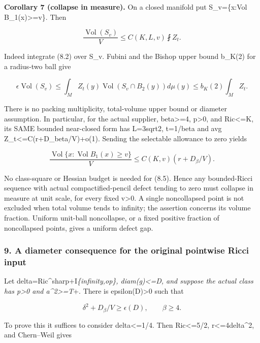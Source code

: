 \documentclass[
  10pt,
]{article}
\begin{document}
\textbf{Corollary 7 (collapse in measure).} On a closed manifold put
S\_v=\{x:Vol B\_1(x)\textgreater=v\}. Then

\[
 \boxed{\frac{\operatorname{Vol}(S_v)}V
       \le C(K,L,v)\fint Z_t.}                        \tag{8.4}
\]

Indeed integrate (8.2) over S\_v. Fubini and the Bishop upper bound
b\_K(2) for a radius-two ball give

\[
 \epsilon\operatorname{Vol}(S_v)
 \le\int_M Z_t(y)\operatorname{Vol}(S_v\cap B_2(y))d\mu(y)
 \le b_K(2)\int_M Z_t.
\]

There is no packing multiplicity, total-volume upper bound or diameter
assumption. In particular, for the actual supplier, beta\textgreater=4,
p\textgreater0, and \textbar Ric\textbar\textless=K, its SAME bounded
near-closed form has L=3sqrt2, t=1/beta and avg
Z\_t\textless=C(r+D\_beta/V)+o(1). Sending the selectable allowance to
zero yields

\[
 \boxed{\frac{\operatorname{Vol}\{x:\operatorname{Vol}B_1(x)\ge v\}}V
       \le C(K,v)(r+D_\beta/V).}                      \tag{8.5}
\]

No class-square or Hessian budget is needed for (8.5). Hence any
bounded-Ricci sequence with actual compactified-pencil defect tending to
zero must collapse in measure at unit scale, for every fixed
v\textgreater0. A single noncollapsed point is not excluded when total
volume tends to infinity; the assertion concerns its volume fraction.
Uniform unit-ball noncollapse, or a fixed positive fraction of
noncollapsed points, gives a uniform defect gap.

\hypertarget{a-diameter-consequence-for-the-original-pointwise-ricci-input}{%
\subsubsection{9. A diameter consequence for the original pointwise
Ricci
input}\label{a-diameter-consequence-for-the-original-pointwise-ricci-input}}

Let
delta=\textbar\textbar Ric\^{}sharp+I\textbar\textbar{}\emph{\{infinity,op\},
diam(g)\textless=D, and suppose the actual class has p\textgreater0 and
a\^{}2\textgreater=T}+. There is epsilon(D)\textgreater0 such that

\[
                  \boxed{\delta^2+D_\beta/V\ge\epsilon(D),
                              \qquad\beta\ge4.}       \tag{9.1}
\]

To prove this it suffices to consider delta\textless=1/4. Then
\textbar Ric\textbar\textless=5/2, r\textless=4delta\^{}2, and
Chern--Weil gives
\end{document}
